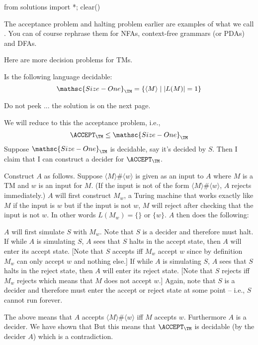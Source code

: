 \begin{python0}
from solutions import *; clear()
\end{python0}

The acceptance problem and halting problem earlier are examples
of what we call .
You can of course rephrase them for NFAs,
context-free grammars (or PDAs)
and DFAs.

Here are more decision problems for TMs.

\newpage
\newcommand\SIZEONE{\mathsc{Size-One}}
\begin{ex}
Is the following language decidable:
\[
\SIZEONE_\TM = \{ \langle M \rangle \mid |L(M)| = 1 \}
\]
\end{ex}

Do not peek ... the solution is on the next page.


\newpage
\SOLUTION

We will reduce to this the acceptance problem, i.e.,
\[
\ACCEPT_\TM \leq \SIZEONE_\TM
\]
Suppose $\SIZEONE_\TM$ is decidable, say it's decided by $S$.
Then I claim that I can construct a decider for $\ACCEPT_\TM$.

Construct $A$ as follows.
Suppose $\langle M \rangle \# \langle w \rangle$ is given
as an input to $A$ where
$M$ is a TM and $w$ is an input for $M$.
(If the input is not of the form $\langle M \rangle \# \langle w \rangle$,
$A$ rejects immediately.)
$A$ will first construct $M_w$, a Turing machine
that works exactly like $M$ if the input is $w$
but if the input is not $w$, $M$ will reject after checking that the
input is not $w$.
In other words $L(M_w) = \{\}$ or $\{w\}$.
$A$ then does the following:
\begin{tightlist}
  \li $A$ will first simulate
  $S$ with $M_w$.
  Note that $S$ is a decider and therefore must halt.
  \li If while $A$ is simulating
  $S$, $A$ sees that $S$ halts in the accept state, then
  $A$ will enter its accept state.
  [Note that $S$ accepts iff $M_w$
  accept $w$ since by definition $M_w$ can only accept $w$
  and nothing else.]
  \li
  If while $A$ is simulating $S$, $A$ sees that $S$
  halts in the reject state, then $A$ will enter its reject state.
  [Note that $S$ rejects iff $M_w$ rejects
  which means that $M$ does not accept $w$.]
  \li Again, note that $S$ is a decider and therefore must enter
  the accept or reject state at some point -- i.e., $S$
  cannot run forever.
\end{tightlist}
The above means that $A$ accepts $\langle M \rangle \# \langle w \rangle$
iff $M$ accepts $w$. Furthermore $A$ is a decider.
We have shown that
But this means that $\ACCEPT_\TM$ is decidable (by the decider $A$)
which is a contradiction.



